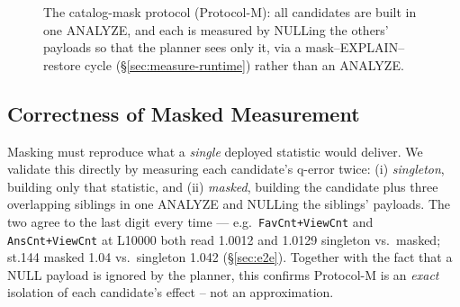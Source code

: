 \documentclass[sigconf, nonacm]{acmart}
\begin{document}
\begin{figure}[t]
\centering
{}
\caption{The catalog-mask protocol (Protocol-M): all candidates are built in one
ANALYZE, and each is measured by NULLing the others' payloads so that the
planner sees only it, via a mask--EXPLAIN--restore cycle
(\S\ref{sec:measure-runtime}) rather than an ANALYZE.}
\label{fig:mask}
\end{figure}

\subsection{Correctness of Masked Measurement}
\label{sec:measure-correct}

Masking must reproduce what a \emph{single} deployed statistic would deliver.
We validate this directly by measuring each candidate's q-error twice: (i)
\emph{singleton}, building only that statistic, and (ii) \emph{masked}, building
the candidate plus three overlapping siblings in one ANALYZE and NULLing the
siblings' payloads. The two agree to the last digit every time --- e.g.\
\texttt{FavCnt+ViewCnt} and \texttt{AnsCnt+ViewCnt} at L10000 both read
1.0012 and 1.0129 singleton vs.\ masked; st.144 masked 1.04 vs.\ singleton
1.042 (\S\ref{sec:e2e}). Together with the fact that a NULL payload is ignored
by the planner, this confirms Protocol-M is an \emph{exact} isolation of each
candidate's effect -- not an approximation.
\end{document}
